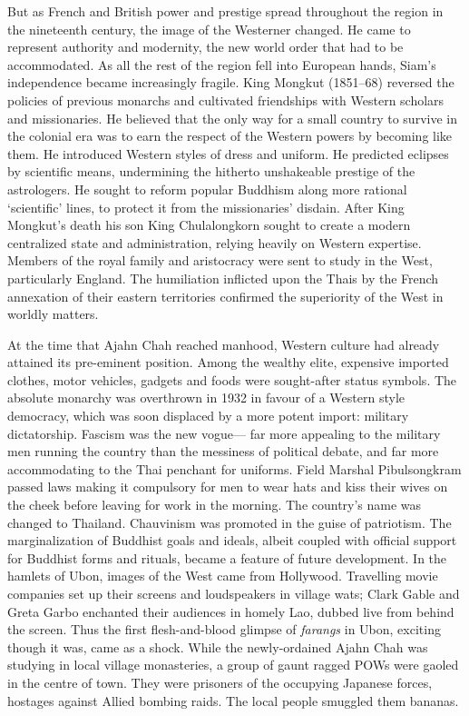 But as French and British power and prestige spread throughout the
region in the nineteenth century, the image of the Westerner changed. He
came to represent authority and modernity, the new world order that had
to be accommodated. As all the rest of the region fell into European
hands, Siam's independence became increasingly fragile. King Mongkut
(1851--68) reversed the policies of previous monarchs and cultivated
friendships with Western scholars and missionaries. He believed that the
only way for a small country to survive in the colonial era was to earn
the respect of the Western powers by becoming like them. He introduced
Western styles of dress and uniform. He predicted eclipses by scientific
means, undermining the hitherto unshakeable prestige of the astrologers.
He sought to reform popular Buddhism along more rational `scientific'
lines, to protect it from the missionaries' disdain. After King
Mongkut's death his son King Chulalongkorn sought to create a modern
centralized state and administration, relying heavily on Western
expertise. Members of the royal family and aristocracy were sent to
study in the West, particularly England. The humiliation inflicted upon
the Thais by the French annexation of their eastern territories
confirmed the superiority of the West in worldly matters.

At the time that Ajahn Chah reached manhood, Western culture had already
attained its pre-eminent position. Among the wealthy elite, expensive
imported clothes, motor vehicles, gadgets and foods were sought-after
status symbols. The absolute monarchy was overthrown in 1932 in favour
of a Western style democracy, which was soon displaced by a more potent
import: military dictatorship. Fascism was the new vogue--- far more
appealing to the military men running the country than the messiness of
political debate, and far more accommodating to the Thai penchant for
uniforms. Field Marshal Pibulsongkram passed laws making it compulsory
for men to wear hats and kiss their wives on the cheek before leaving
for work in the morning. The country's name was changed to Thailand.
Chauvinism was promoted in the guise of patriotism. The marginalization
of Buddhist goals and ideals, albeit coupled with official support for
Buddhist forms and rituals, became a feature of future development. In
the hamlets of Ubon, images of the West came from Hollywood. Travelling
movie companies set up their screens and loudspeakers in village wats;
Clark Gable and Greta Garbo enchanted their audiences in homely Lao,
dubbed live from behind the screen. Thus the first flesh-and-blood
glimpse of \emph{farangs} in Ubon, exciting though it was, came as a
shock. While the newly-ordained Ajahn Chah was studying in local village
monasteries, a group of gaunt ragged POWs were gaoled in the centre of
town. They were prisoners of the occupying Japanese forces, hostages
against Allied bombing raids. The local people smuggled them bananas.

